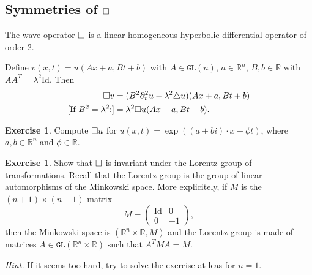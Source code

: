 \documentclass[a4paper,9pt]{amsart}
\newcommand{\R}{\mathbb{R}}	%
\newcommand{\Id}{\mathrm{Id}}	%
\newcommand{\de}{\partial}		%
\newcommand{\GL}{\mathtt{GL}}
\newcommand{\laplacian}{\triangle}
\theoremstyle{plain}
\theoremstyle{definition}
\newtheorem{exercise}[proposition]{Exercise}%
\theoremstyle{remark}
\begin{document}
\subsection{Symmetries of $\square$}\label{subs67cd41e1}
The wave operator $\square$ is a linear homogeneous hyperbolic differential operator of order 2.

Define $v(x,t) = u(Ax+a, Bt+b)$ with $A\in \GL(n)$, $a\in \R^n$, $B,b\in\R$
with $AA^T = \lambda^2\Id$.
Then
\begin{align*}
	\waveop v 
	&= (B^2\de_t^2u - \lambda^2 \laplacian u)(Ax+a,Bt+b) \\
	\text{[If $B^2=\lambda^2$:]}
	&= \lambda^2 \waveop u(Ax+a,Bt+b) .
\end{align*}

\begin{exercise}
	Compute $\square u$ for $u(x,t) = \exp((a+bi)\cdot x+\phi t)$, where $a,b\in\R^n$ and $\phi\in\R$.
\end{exercise}

\begin{exercise}
	Show that $\square$ is invariant under the Lorentz group of transformations.
	Recall that the Lorentz group is the group of linear automorphisms of the Minkowski space.
	More explicitely, if $M$ is the $(n+1)\times(n+1)$ matrix
	\begin{equation}
		M = \begin{pmatrix}\Id & 0 \\ 0 & -1 \end{pmatrix} ,
	\end{equation}
	then the Minkowski space is $(\R^n\times\R,M)$
	and the Lorentz group is made of matrices $A\in \GL(\R^n\times\R)$ such that $A^TMA = M$.
	
	{\it Hint.}
	If it seems too hard, try to solve the exercise at leas for $n=1$.
\end{exercise}

\end{document}
